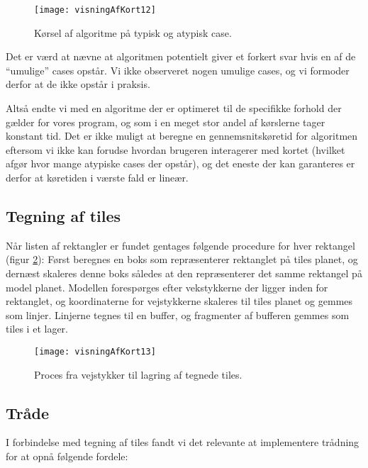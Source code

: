 \begin{figure}[h]
	\centering
	\texttt{[image: visningAfKort12]}
	\captionsetup{width=0.8\textwidth}
	\caption{Kørsel af algoritme på typisk og atypisk case.}
	\label{figur:visningAfKort12}
\end{figure}

Det er værd at nævne at algoritmen potentielt giver et forkert svar hvis en af de ``umulige'' cases opstår. Vi ikke observeret nogen umulige cases, og vi formoder derfor at de ikke opstår i praksis.

Altså endte vi med en algoritme der er optimeret til de specifikke forhold der gælder for vores program, og som i en meget stor andel af kørslerne tager konstant tid. Det er ikke muligt at beregne en gennemsnitskøretid for algoritmen eftersom vi ikke kan forudse hvordan brugeren interagerer med kortet (hvilket afgør hvor mange atypiske cases der opstår), og det eneste der kan garanteres er derfor at køretiden i værste fald er lineær.

\subsection{Tegning af tiles}
\label{subsec:tegningAfTiles}

Når listen af rektangler er fundet gentages følgende procedure for hver rektangel (figur \ref{figur:visningAfKort13}): Først beregnes en boks som repræsenterer rektanglet på tiles planet, og dernæst skaleres denne boks således at den repræsenterer det samme rektangel på model planet. Modellen forespørges efter vekstykkerne der ligger inden for rektanglet, og koordinaterne for vejstykkerne skaleres til tiles planet og gemmes som linjer. Linjerne tegnes til en buffer, og fragmenter af bufferen gemmes som tiles i et lager.

\begin{figure}[h]
	\centering
	\texttt{[image: visningAfKort13]}
	\captionsetup{width=0.8\textwidth}
	\caption{Proces fra vejstykker til lagring af tegnede tiles.}
	\label{figur:visningAfKort13}
\end{figure}

\subsection{Tråde}
\label{subsec:traade}

I forbindelse med tegning af tiles fandt vi det relevante at implementere trådning for at opnå følgende fordele:

